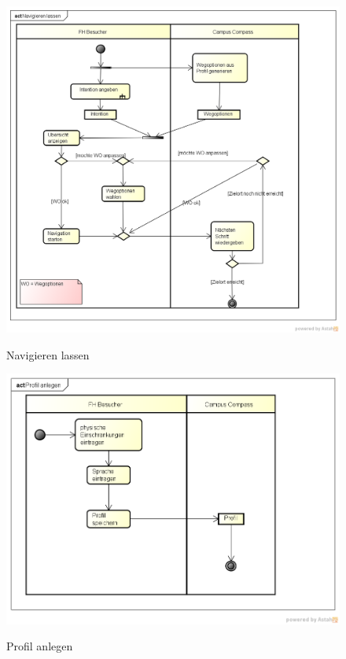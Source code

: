 \begin{figure}[hbt]
  \centering
  \includegraphics[width=\linewidth]{img/akt_navigieren_lassen.png}
  \label{img:akt_navigieren_lassen}
  \caption{Navigieren lassen}
\end{figure}

\begin{figure}[hbt]
  \centering
  \includegraphics[width=\linewidth]{img/akt_profil_anlegen.png}
  \label{img:akt_profil_anlegen}
  \caption{Profil anlegen}
\end{figure}
